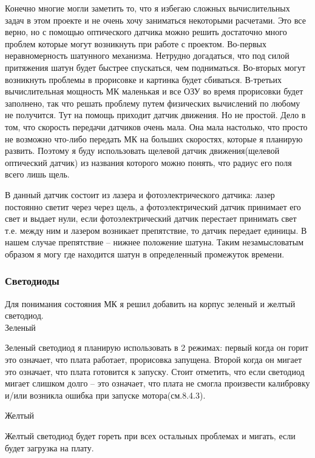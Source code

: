 \documentclass[a4paper, 12pt]{article}
\begin{document}
Конечно многие могли заметить то, что я избегаю сложных вычислительных
задач в этом проекте и не очень хочу заниматься некоторыми расчетами. Это все
верно, но с помощью оптического датчика можно решить достаточно много проблем
которые могут возникнуть при работе с проектом. Во-первых неравномерность
шатунного механизма. Нетрудно догадаться, что под силой притяжения шатун будет
быстрее спускаться, чем подниматься. Во-вторых могут возникнуть проблемы
в прорисовке и картинка будет сбиваться. В-третьих вычислительная мощность МК
маленькая и все ОЗУ во время прорисовки будет заполнено, так что решать
проблему путем физических вычислений по любому не получится. Тут на помощь
приходит датчик движения. Но не простой. Дело в том, что скорость передачи
датчиков очень мала. Она мала настолько, что просто не возможно что-либо
передать МК на больших скоростях, которые я планирую развить. Поэтому я буду
использовать щелевой датчик движения(щелевой оптический датчик) из названия
которого можно понять, что радиус его поля всего лишь щель.

В данный датчик состоит из лазера и фотоэлектрического датчика: лазер постоянно
светит через через щель, а фотоэлектрический датчик принимает его свет и
выдает нули, если фотоэлектрический датчик перестает принимать свет т.е. между
ним и лазером возникает препятствие, то датчик передает единицы. В нашем случае
препятствие -- нижнее положение шатуна. Таким незамысловатым образом я могу
где находится шатун в определенный промежуток времени.


\subsubsection{Светодиоды}

Для понимания состояния МК я решил добавить на корпус зеленый и желтый 
светодиод.\\
\textbf{$\text{Зеленый}$}

Зеленый светодиод я планирую использовать в 2 режимах: первый когда он 
горит это означает, что плата работает, прорисовка запущена. Второй когда он 
мигает это означает, что плата готовится к запуску. Стоит отметить, что если
светодиод мигает слишком долго -- это означает, что плата не смогла произвести
калибровку и/или возникла ошибка при запуске мотора(см.8.4.3).

\textbf{$\text{Желтый}$}

Желтый светодиод будет гореть при всех остальных проблемах и мигать, если будет
загрузка на плату.
\end{document}
